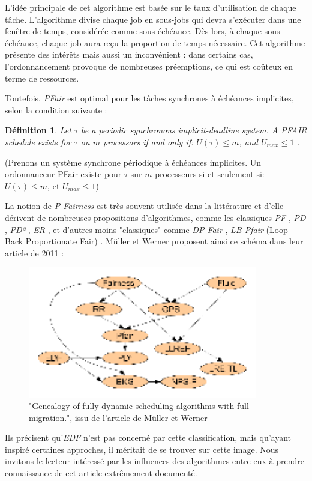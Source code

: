 \documentclass[11pt,a4paper,oneside]{report}
\newtheorem{mydef}{Définition}
\begin{document}
	L'idée principale de cet algorithme est basée sur le taux d'utilisation de chaque tâche. 
	L'algorithme divise chaque job en sous-jobs qui devra s'exécuter dans une fenêtre de temps, 
	considérée comme sous-échéance. Dès lors, à chaque sous-échéance, 
	chaque job aura reçu la proportion de temps nécessaire. 
	Cet algorithme présente des intérêts mais aussi un inconvénient : dans certains cas, 
	l'ordonnancement provoque de nombreuses préemptions, ce qui est coûteux en terme de ressources.\medskip
	
	Toutefois, \textit{PFair} est optimal pour les tâches synchrones à échéances implicites, selon 
	la condition suivante :\medskip
	\begin{mydef}
		Let $\tau$ be a periodic synchronous implicit-deadline system.
		A PFAIR schedule exists for $\tau$ on $m$ processors if and only if:\medskip
		$U(\tau) \leq m$, and $U_{max} \leq 1$ \cite{baruah_proportionate_1996}.
	\end{mydef}
	(Prenons un système synchrone périodique à échéances implicites. 
	Un ordonnanceur PFair existe pour $\tau$ sur $m$ processeurs si et seulement si:\medskip
	$U(\tau) \leq m$, et $U_{max} \leq 1$)\medskip
	
	La notion de \textit{P-Fairness} est très souvent utilisée dans la littérature et d'elle dérivent 
	de nombreuses propositions d'algorithmes, comme les classiques \textit{PF} \cite{baruah_proportionate_1996}, \textit{PD} \cite{baruah_fast_1995}, \textit{PD²} \cite{srinivasan_optimal_2006} , \textit{ER} \cite{anderson_early-release_2000}, 
	et d'autres moins "classiques" comme \textit{DP-Fair} \cite{levin_dp-fair_2010}, 
	\textit{LB-Pfair} (Loop-Back Proportionate Fair) \cite{kramer_proportionate_2015}. 
	Müller et Werner proposent ainsi ce schéma dans leur article de 2011 :\medskip
	\begin{figure}[ht]
		\caption{"Genealogy of fully dynamic scheduling algorithms with full migration.", issu de l'article de Müller et Werner\cite{muller_genealogy_2011}}
		\includegraphics[width=10cm]{img/genealogy_pf}
	\end{figure}
	Ils précisent qu'\textit{EDF} n'est pas concerné par cette classification, mais qu'ayant 
	inspiré certaines approches, il méritait de se trouver sur cette image. 
	Nous invitons le lecteur intéressé par les influences des algorithmes entre eux 
	à prendre connaissance de cet article extrêmement documenté.\medskip
	
\end{document}
